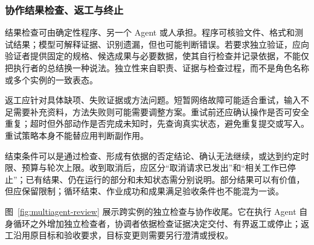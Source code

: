 \documentclass[11pt,a4paper]{article}
\begin{document}
\subsubsection{协作结果检查、返工与终止}
\label{sec:normalflow}

结果检查可由确定性程序、另一个 Agent 或人承担。程序可核验文件、格式和测试结果；模型可解释证据、识别遗漏，但也可能判断错误。若要求独立验证，应向验证者提供固定的规格、候选成果与必要数据，使其自行检查并记录依据，不能仅把执行者的总结换一种说法。独立性来自职责、证据与检查过程，而不是角色名称或多个实例的一致表态。

返工应针对具体缺项、失败证据或方法问题。短暂网络故障可能适合重试，输入不足需要补充资料，方法失败则可能需要调整方案。重试前还应确认操作是否可安全重复；超时但外部动作是否完成未知时，先查询真实状态，避免重复提交或写入。重试策略本身不能替应用判断副作用。

结束条件可以是通过检查、形成有依据的否定结论、确认无法继续，或达到约定时限、预算与轮次上限。收到取消后，应区分“取消请求已发出”和“相关工作已停止”；已有结果、仍在运行的部分和未知状态需分别说明。部分结果可以有价值，但应保留限制；循环结束、作业成功和成果满足验收条件也不能混为一谈。

图~\ref{fig:multiagent-review} 展示跨实例的独立检查与协作收尾。它在执行 Agent 自身循环之外增加独立检查者，协调者依据检查证据决定交付、有界返工或停止；返工沿用原目标和验收要求，目标变更则需要另行澄清或授权。
\end{document}
